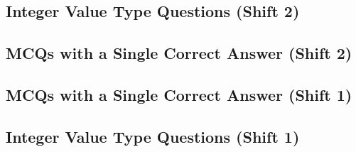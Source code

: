 \subsection*{Integer Value Type Questions (Shift 2)}
\begin{enumerate}[label=\thechapter.\arabic*,ref=\thechapter.\theenumi]



\end{enumerate}

\subsection*{MCQs with a Single Correct Answer (Shift 2)}
\begin{enumerate}[label=\thechapter.\arabic*,ref=\thechapter.\theenumi]



\end{enumerate}

\subsection*{MCQs with a Single Correct Answer (Shift 1)}
\begin{enumerate}[label=\thechapter.\arabic*,ref=\thechapter.\theenumi]



\end{enumerate}

\subsection*{Integer Value Type Questions (Shift 1)}
\begin{enumerate}[label=\thechapter.\arabic*,ref=\thechapter.\theenumi]



\end{enumerate}
